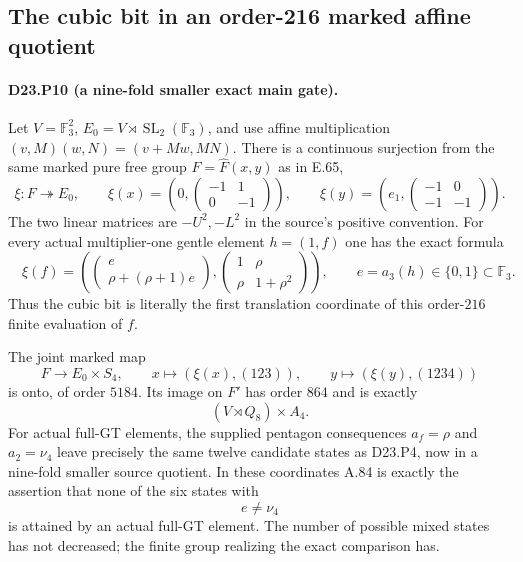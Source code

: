 \subsection{The cubic bit in an order-216 marked affine quotient}

\paragraph{D23.P10 (a nine-fold smaller exact main gate).}
Let $V=\mathbb F_3^2$, $E_0=V\rtimes\operatorname{SL}_2(\mathbb F_3)$,
and use affine multiplication $(v,M)(w,N)=(v+Mw,MN)$.
There is a continuous surjection from the same marked pure free
group $F=\widehat F(x,y)$ as in E.65,
\[
 \xi:F\twoheadrightarrow E_0,\qquad
 \xi(x)=\left(0,\begin{pmatrix}-1&1\\0&-1\end{pmatrix}\right),\qquad
 \xi(y)=\left(e_1,\begin{pmatrix}-1&0\\-1&-1\end{pmatrix}\right).
\tag{D23.P10.1}
\]
The two linear matrices are $-U^2,-L^2$ in the source's positive
convention. For every actual multiplier-one gentle element
$h=(1,f)$ one has the exact formula
\[
 \boxed{\quad
 \xi(f)=\left(
   \begin{pmatrix}e\\\rho+(\rho+1)e\end{pmatrix},
   \begin{pmatrix}1&\rho\\\rho&1+\rho^2\end{pmatrix}
  \right),\qquad e=a_3(h)\in\{0,1\}\subset\mathbb F_3.
 \quad}
\tag{D23.P10.2}
\]
Thus the cubic bit is literally the first translation coordinate
of this order-$216$ finite evaluation of $f$.

The joint marked map
\[
 F\longrightarrow E_0\times S_4,\qquad
 x\longmapsto(\xi(x),(123)),\qquad
 y\longmapsto(\xi(y),(1234))
\tag{D23.P10.3}
\]
is onto, of order $5184$. Its image on $F'$ has order $864$ and
is exactly
\[
 (V\rtimes Q_8)\times A_4.
\tag{D23.P10.4}
\]
For actual full-GT elements, the supplied pentagon consequences
$a_f=\rho$ and $a_2=\nu_4$ leave precisely the same twelve
candidate states as D23.P4, now in a nine-fold smaller source
quotient. In these coordinates A.84 is exactly the assertion
that none of the six states with
\[
                  e\ne\nu_4
\tag{D23.P10.5}
\]
is attained by an actual full-GT element. The number of possible
mixed states has not decreased; the finite group realizing the
exact comparison has.

